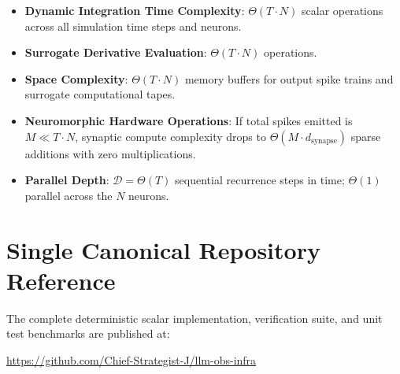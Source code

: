 \documentclass[11pt,a4paper]{article}
\theoremstyle{definition}
\begin{document}
\begin{itemize}
    \item \textbf{Dynamic Integration Time Complexity}: $\Theta(T \cdot N)$ scalar operations across all simulation time steps and neurons.
    \item \textbf{Surrogate Derivative Evaluation}: $\Theta(T \cdot N)$ operations.
    \item \textbf{Space Complexity}: $\Theta(T \cdot N)$ memory buffers for output spike trains and surrogate computational tapes.
    \item \textbf{Neuromorphic Hardware Operations}: If total spikes emitted is $M \ll T \cdot N$, synaptic compute complexity drops to $\Theta(M \cdot d_{\text{synapse}})$ sparse additions with zero multiplications.
    \item \textbf{Parallel Depth}: $\mathcal{D} = \Theta(T)$ sequential recurrence steps in time; $\Theta(1)$ parallel across the $N$ neurons.
\end{itemize}

\section{Single Canonical Repository Reference}

The complete deterministic scalar implementation, verification suite, and unit test benchmarks are published at:
\begin{center}
\url{https://github.com/Chief-Strategist-J/llm-obs-infra}
\end{center}
\end{document}
